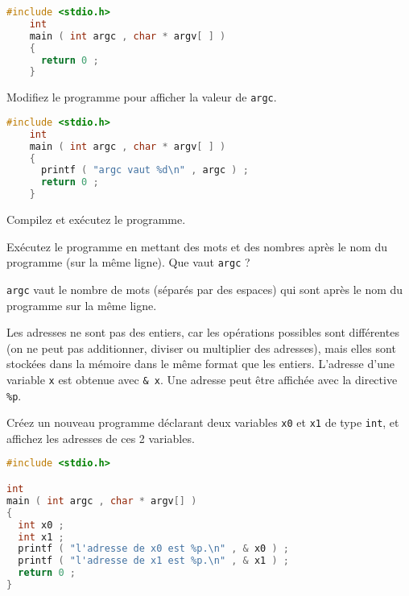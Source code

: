 \begin{solutioncachee}
  \begin{lstlisting}[language=C]
    #include <stdio.h>
    int
    main ( int argc , char * argv[ ] )
    {
      return 0 ;
    }
  \end{lstlisting}
\end{solutioncachee}

\question Modifiez le programme pour afficher la valeur de \texttt{argc}. 

\begin{solutioncachee}
  \begin{lstlisting}[language=C]
    #include <stdio.h>
    int
    main ( int argc , char * argv[ ] )
    {
      printf ( "argc vaut %d\n" , argc ) ;
      return 0 ;
    }
  \end{lstlisting}
\end{solutioncachee}

\question Compilez et exécutez le programme.

\question Exécutez le programme en mettant des mots et des nombres
après le nom du programme (sur la même ligne). Que vaut
\texttt{argc} ?

\begin{solutioncachee}
  \texttt{argc} vaut le nombre de mots (séparés par des espaces) qui
  sont après le nom du programme sur la même ligne.
\end{solutioncachee}


Les adresses ne sont pas des entiers, car les opérations possibles
sont différentes (on ne peut pas additionner, diviser ou multiplier
des adresses), mais elles sont stockées dans la mémoire dans le même
format que les entiers. L'adresse d'une variable \texttt{x} est
obtenue avec \texttt{\& x}. Une adresse peut être affichée avec la
directive \texttt{\%p}.

\question Créez un nouveau programme déclarant deux variables
\texttt{x0} et \texttt{x1} de type \texttt{int}, et affichez les
adresses de ces 2 variables.

\begin{solutioncachee}
  \begin{lstlisting}[language=C]
#include <stdio.h>

int
main ( int argc , char * argv[] )
{
  int x0 ;
  int x1 ;
  printf ( "l'adresse de x0 est %p.\n" , & x0 ) ;
  printf ( "l'adresse de x1 est %p.\n" , & x1 ) ;
  return 0 ;
}
  \end{lstlisting}
\end{solutioncachee}


